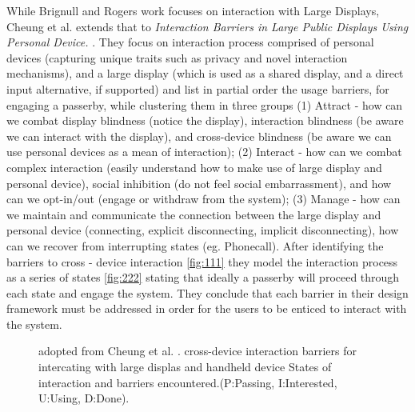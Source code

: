 While Brignull and Rogers work focuses on interaction with Large Displays, Cheung et al.  extends that to \emph{Interaction Barriers in Large Public Displays Using Personal Device.} \cite{Cheung:2014}. They focus on interaction process comprised of personal devices (capturing unique traits such as privacy and novel interaction mechanisms), and a large display (which is used as a shared display, and a direct input alternative, if supported) and list in partial order the usage barriers, for engaging a passerby, while clustering them in three groups (1) Attract - how can we combat display blindness (notice the display), interaction blindness (be aware we can interact with the display), and cross-device blindness (be aware we can use personal devices as a mean of interaction); (2) Interact - how can we combat complex interaction (easily understand how to make use of large display and personal device), social inhibition (do not feel social embarrassment),  and how can we opt-in/out (engage or withdraw from the system); (3) Manage - how can we maintain and communicate the connection between the large display and personal device (connecting, explicit disconnecting, implicit disconnecting), how can we recover from interrupting states (eg. Phonecall). After identifying the barriers to cross - device interaction \ref{fig:111} they model the interaction process as a series of states \ref{fig:222} stating that ideally a passerby will proceed through each state and engage the system. They conclude that each barrier in their design framework must be addressed in order for the users to be enticed to interact with the system.


\begin{figure}[H]
	\centering
	\caption{
		adopted from Cheung et al. \protect\cite{Cheung:2014}.
		\protect{} cross-device interaction barriers for intercating with large displas and handheld device
		\protect{} States  of interaction and barriers encountered.(P:Passing, I:Interested, U:Using, D:Done).
		}
	\label{fig:Cheung et al. ideas}
\end{figure}
